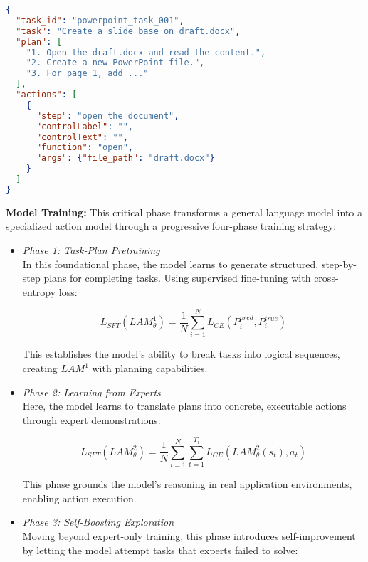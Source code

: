 \documentclass[journal,twoside,10pt]{IEEEtran}
\begin{document}
\begin{lstlisting}[language=JSON]
{
  "task_id": "powerpoint_task_001",
  "task": "Create a slide base on draft.docx",
  "plan": [
    "1. Open the draft.docx and read the content.",
    "2. Create a new PowerPoint file.",
    "3. For page 1, add ..."
  ],
  "actions": [
    {
      "step": "open the document",
      "controlLabel": "",
      "controlText": "",
      "function": "open",
      "args": {"file_path": "draft.docx"}
    }
  ]
}
\end{lstlisting}


\textbf{Model Training:} This critical phase transforms a general language model into a specialized action model through a progressive four-phase training strategy:

\begin{itemize}
    \item \textit{Phase 1: Task-Plan Pretraining}\\
    In this foundational phase, the model learns to generate structured, step-by-step plans for completing tasks. Using supervised fine-tuning with cross-entropy loss:
    
    \begin{equation}
    L_{SFT}(LAM^1_{\theta}) = \frac{1}{N} \sum_{i=1}^{N} L_{CE}(P^{pred}_i, P^{true}_i)
    \end{equation}
    
    This establishes the model's ability to break tasks into logical sequences, creating $LAM^1$ with planning capabilities.
    
    \item \textit{Phase 2: Learning from Experts}\\
    Here, the model learns to translate plans into concrete, executable actions through expert demonstrations:
    
    \begin{equation}
    L_{SFT}(LAM^2_{\theta}) = \frac{1}{N} \sum_{i=1}^{N} \sum_{t=1}^{T_i} L_{CE}(LAM^2_{\theta}(s_t), a_t)
    \end{equation}
    
    This phase grounds the model's reasoning in real application environments, enabling action execution.
    
    \item \textit{Phase 3: Self-Boosting Exploration}\\
    Moving beyond expert-only training, this phase introduces self-improvement by letting the model attempt tasks that experts failed to solve:
    

\end{itemize}
\end{document}
